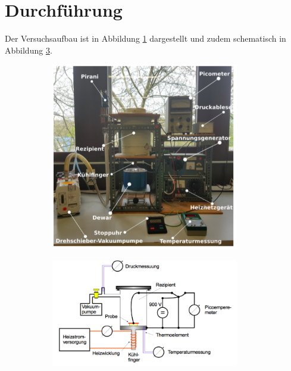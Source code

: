 \section{Durchführung}
\label{sec:Durchführung}
Der Versuchsaufbau ist in Abbildung \ref{fig:aufbau} dargestellt und zudem schematisch in Abbildung \ref{fig:aufbau2}.
\begin{figure}
\begin{subfigure}[b]{0.45\textwidth}
\includegraphics[width=0.9\textwidth]{Aufbau.png}
\label{fig:aufbau}
\end{subfigure}
\begin{subfigure}[b]{0.55\textwidth}
\includegraphics[width=0.9\textwidth]{Aufbau2.png}
\label{fig:aufbau2}
\end{subfigure}
\end{figure}
